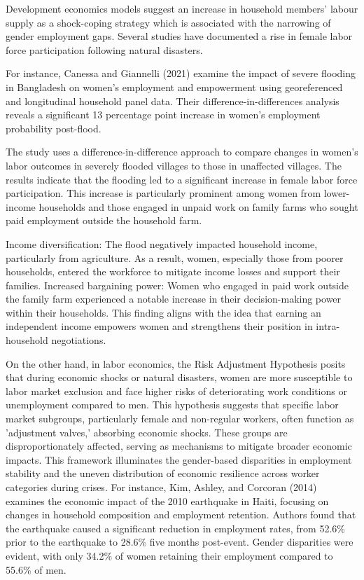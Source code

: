 \documentclass[12pt,halfline,a4paper]{ouparticle}
\begin{document}
Development economics models suggest an increase in household members’ labour supply as a shock-coping strategy which is associated with the narrowing of gender employment gaps. Several studies have documented a rise in female labor force participation following natural disasters. 


For instance, Canessa and Giannelli (2021)\cite{Canessa2021WomensShocks} examine the impact of severe flooding in Bangladesh on women's employment and empowerment using georeferenced and longitudinal household panel data. Their difference-in-differences analysis reveals a significant 13 percentage point increase in women's employment probability post-flood. 


The study uses a difference-in-difference approach to compare changes in women’s labor outcomes in severely flooded villages to those in unaffected villages. The results indicate that the flooding led to a significant increase in female labor force participation. This increase is particularly prominent among women from lower-income households and those engaged in unpaid work on family farms who sought paid employment outside the household farm.


Income diversification: The flood negatively impacted household income, particularly from agriculture. As a result, women, especially those from poorer households, entered the workforce to mitigate income losses and support their families.
Increased bargaining power: Women who engaged in paid work outside the family farm experienced a notable increase in their decision-making power within their households. This finding aligns with the idea that earning an independent income empowers women and strengthens their position in intra-household negotiations.


On the other hand, in labor economics, the Risk Adjustment Hypothesis posits that during economic shocks or natural disasters, women are more susceptible to labor market exclusion and face higher risks of deteriorating work conditions or unemployment compared to men. This hypothesis suggests that specific labor market subgroups, particularly female and non-regular workers, often function as 'adjustment valves,' absorbing economic shocks. These groups are disproportionately affected, serving as mechanisms to mitigate broader economic impacts. This framework illuminates the gender-based disparities in employment stability and the uneven distribution of economic resilience across worker categories during crises. For instance, Kim, Ashley, and Corcoran (2014) examines the economic impact of the 2010 earthquake in Haiti, focusing on changes in household composition and employment retention. Authors found that the earthquake caused a significant reduction in employment rates, from 52.6\% prior to the earthquake to 28.6\% five months post-event. Gender disparities were evident, with only 34.2\% of women retaining their employment compared to 55.6\% of men. 
\end{document}
